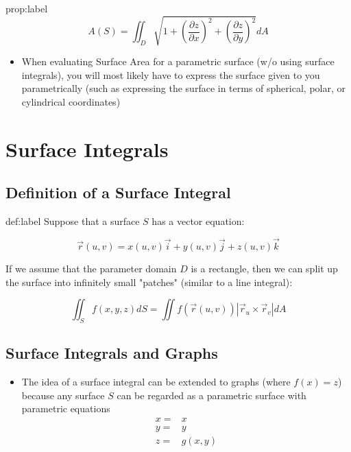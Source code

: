 \documentclass{package/notes}
\begin{document}
\begin{proposition}{prop:label}
	$$A(S) = \iint_D\sqrt{1+ \left(\frac{\partial{z}}{\partial{x}}\right)^2+\left(\frac{\partial{z}}{\partial{y}}\right)^2}dA$$
\end{proposition}

\begin{itemize}
	\item When evaluating Surface Area for a parametric surface (w/o using surface integrals), you will most likely have to express the surface given to you parametrically (such as expressing the surface in terms of spherical, polar, or cylindrical coordinates)
\end{itemize}


\newpage
\section{Surface Integrals}


\subsection{Definition of a Surface Integral}

\begin{definition}{def:label}
	Suppose that a  surface $S$ has a vector equation:

	$$\vec{r}(u, v)=x(u,v)\vec{i}+y(u,v)\vec{j}+z(u,v)\vec{k}$$

	If we assume that the parameter domain $D$ is a rectangle, then we can split up the surface into infinitely small "patches" (similar to a line integral):

	$$\iint_Sf(x,y,z)dS = \iint f(\vec{r}(u,v))|\vec{r}_u \times \vec{r}_v|dA$$
\end{definition}


\subsection{Surface Integrals and Graphs}

\begin{itemize}
	\item The idea of a surface integral can be extended to graphs (where $f(x) = z$) because any surface $S$ can be regarded as a parametric surface with parametric equations
	$$\begin{aligned}x =&x\\y=&y\\z=&g(x,y)\end{aligned}$$
\end{itemize}
\end{document}
